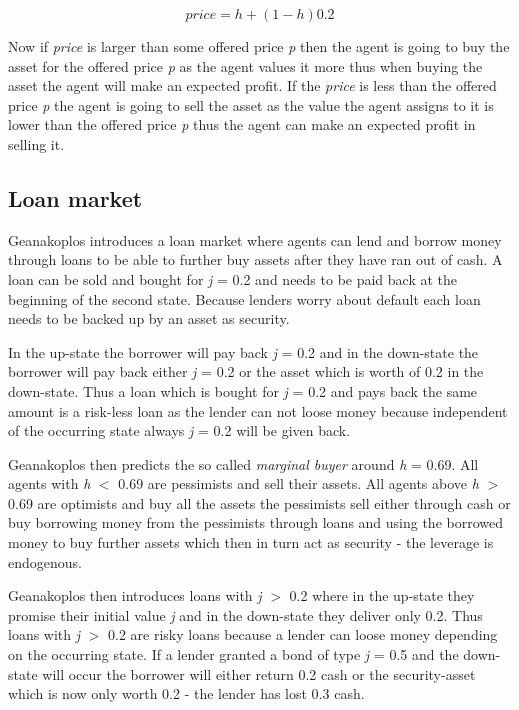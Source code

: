 \documentclass[../Bachelorarbeit.tex]{subfiles}
\begin{document}
\begin{equation}
price = h + (1 - h)0.2
\end{equation}

Now if \textit{price} is larger than some offered price \textit{p} then the agent is going to buy the asset for the offered price \textit{p} as the agent values it more thus when buying the asset the agent will make an expected profit. If the \textit{price} is less than the offered price \textit{p} the agent is going to sell the asset as the value the agent assigns to it is lower than the offered price \textit{p} thus the agent can make an expected profit in selling it.

\subsection{Loan market}
Geanakoplos introduces a loan market where agents can lend and borrow money through loans to be able to further buy assets after they have ran out of cash. A loan can be sold and bought for \textit{j} = 0.2 and needs to be paid back at the beginning of the second state. Because lenders worry about default each loan needs to be backed up by an asset as security.

\medskip

In the up-state the borrower will pay back \textit{j} = 0.2 and in the down-state the borrower will pay back either \textit{j} = 0.2 or the asset which is worth of 0.2 in the down-state. Thus a loan which is bought for \textit{j} = 0.2 and pays back the same amount is a risk-less loan as the lender can not loose money because independent of the occurring state always \textit{j} = 0.2 will be given back.

\medskip

Geanakoplos then predicts the so called \textit{marginal buyer} around \textit{h} = 0.69. All agents with \textit{h} $<$ 0.69 are pessimists and sell their assets. All agents above \textit{h} $>$ 0.69 are optimists and buy all the assets the pessimists sell either through cash or buy borrowing money from the pessimists through loans and using the borrowed money to buy further assets which then in turn act as security - the leverage is endogenous.

\medskip

Geanakoplos then introduces loans with \textit{j} $>$ 0.2 where in the up-state they promise their initial value \textit{j} and in the down-state they deliver only 0.2. Thus loans with \textit{j} $>$ 0.2 are risky loans because a lender can loose money depending on the occurring state. If a lender granted a bond of type \textit{j} = 0.5 and the down-state will occur the borrower will either return 0.2 cash or the security-asset which is now only worth 0.2 - the lender has lost 0.3 cash.
\end{document}
